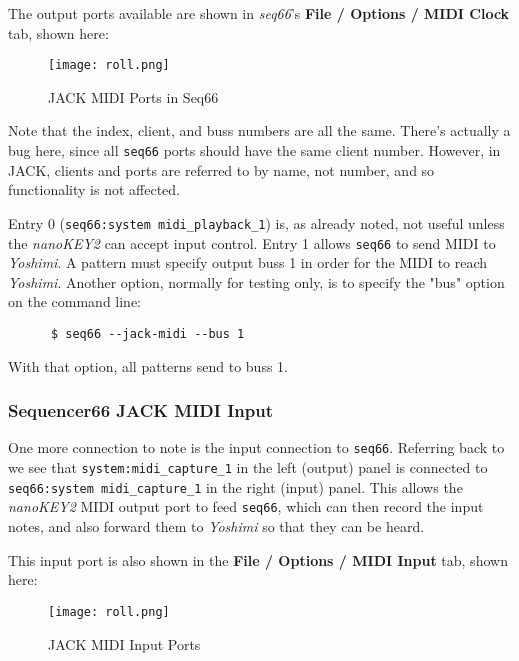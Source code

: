 	The output ports available are shown in \textsl{seq66}'s
	\textbf{File / Options / MIDI Clock} tab, shown here:

\begin{figure}[H]
   \centering 
   \texttt{[image: roll.png]}
   \caption{JACK MIDI Ports in Seq66}
   \label{fig:seq66_jack_nano_yosh_midi_clock}
\end{figure}

   Note that the index, client, and buss numbers are all the same.
   There's actually a bug here, since all \texttt{seq66} ports should have the
   same client number.  However, in JACK, clients and ports are referred to by
   name, not number, and so functionality is not affected.

   Entry 0 (\texttt{seq66:system midi\_playback\_1}) is,
   as already noted, not useful unless the \textsl{nanoKEY2} can
   accept input control.  Entry 1 allows \texttt{seq66} to send MIDI
   to \textsl{Yoshimi}.  A pattern must specify output buss 1 in order for the
   MIDI to reach \textsl{Yoshimi}.  Another option, normally for testing only,
   is to specify the "bus" option on the command line:

   \begin{verbatim}
      $ seq66 --jack-midi --bus 1
   \end{verbatim}

   With that option, all patterns send to buss 1.

\subsubsection{Sequencer66 JACK MIDI Input}
\label{subsubsec:seq66_jack_midi_input}

   One more connection to note is the input connection to \texttt{seq66}.
   Referring back to 
   we see that
   \texttt{system:midi\_capture\_1} in the left (output) panel is connected to
   \texttt{seq66:system midi\_capture\_1} in the right (input) panel.
   This allows the \textsl{nanoKEY2} MIDI output port to feed \texttt{seq66},
   which can then record the input notes, and also forward them to
   \textsl{Yoshimi} so that they can be heard.

   This input port is also shown in the \textbf{File / Options / MIDI Input}
   tab, shown here:

\begin{figure}[H]
   \centering 
   \texttt{[image: roll.png]}
   \caption{JACK MIDI Input Ports}
   \label{fig:seq66_jack_nano_yosh_midi_input}
\end{figure}

